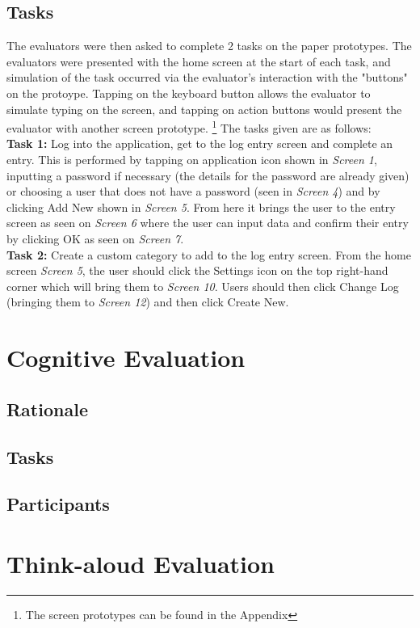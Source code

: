\documentclass[pdftex,12pt,a4paper]{report}
\begin{document}
\section{Tasks}
The evaluators were then asked to complete 2 tasks on the paper prototypes. The evaluators were presented with the home screen at the start of each task, and simulation of the task occurred via the evaluator's interaction with the "buttons" on the protoype. Tapping on the keyboard button allows the evaluator to simulate typing on the screen, and tapping on action buttons would present the evaluator with another screen prototype. \footnote{The screen prototypes can be found in the Appendix} The tasks given are as follows:
\vspace{0.7cm}
\\\textbf{Task 1:} Log into the application, get to the log entry screen and complete an entry.
This is performed by tapping on application icon shown in \textit{Screen 1}, inputting a password
if necessary (the details for the password are already given) or choosing a user that does
not have a password (seen in \textit{Screen 4}) and by clicking Add New shown in \textit{Screen 5}. From here it brings the user to the entry screen as seen on \textit{Screen 6} where the user can input data and confirm their entry by clicking OK as seen on \textit{Screen 7}.
\vspace{0.7cm}
\\\textbf{Task 2:} Create a custom category to add to the log entry screen. From the home screen
\textit{Screen 5}, the user should click the Settings icon on the top right-hand corner which will
bring them to \textit{Screen 10}. Users should then click Change Log (bringing them to \textit{Screen 12}) and then click Create New.

\chapter{Cognitive Evaluation}
\section{Rationale}
\section{Tasks}
\section{Participants}

\chapter{Think-aloud Evaluation}
\end{document}
